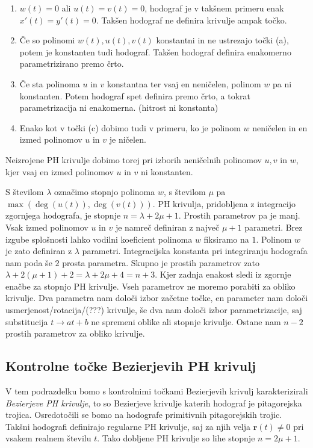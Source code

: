 \documentclass[isrm2, tisk]{fmfdelo}
\begin{document}
    \begin{enumerate}
        \itemsep0em
        \item $w(t)=0$ ali $u(t)=v(t)=0$, hodograf je v takšnem primeru enak $x'(t)=y'(t)=0$.
        Takšen hodograf ne definira krivulje ampak točko.
        \item  Če so polinomi $w(t),u(t),v(t)$ konstantni in ne ustrezajo točki (a), potem je konstanten tudi hodograf.
        Takšen hodograf definira enakomerno parametrizirano premo črto.
        \item  Če sta polinoma $u$ in $v$ konstantna ter vsaj en neničelen, polinom $w$ pa ni konstanten.
        Potem hodograf spet definira premo črto, a tokrat parametrizacija ni enakomerna. (hitrost ni konstanta)
        \item Enako kot v točki (c) dobimo tudi v primeru, ko je polinom $w$ neničelen in en izmed polinomov $u$ in $v$ je ničelen.
    \end{enumerate}
    \vspace{-0.3cm}
    \noindent Neizrojene PH krivulje dobimo torej pri izborih neničelnih polinomov $u,v$ in $w$, kjer vsaj en izmed polinomov $u$ in $v$ ni konstanten.

    S številom $\lambda$ označimo stopnjo polinoma $w$, s številom $\mu$ pa $\max(\deg(u(t)),\deg(v(t)))$.
    PH krivulja, pridobljena z integracijo zgornjega hodografa, je stopnje $n=\lambda + 2\mu + 1$.
    Prostih parametrov pa je manj.
    Vsak izmed polinomov $u$ in $v$ je namreč definiran z največ $\mu + 1$ parametri.
    Brez izgube splošnosti lahko vodilni koeficient polinoma $w$ fiksiramo na $1$.
    Polinom $w$ je zato definiran z $\lambda$ parametri.
    Integracijska konstanta pri integriranju hodografa nam poda še $2$ prosta parametra.
    Skupno je prostih parametrov zato $\lambda + 2(\mu+1)+2=\lambda + 2\mu+4 = n+3$.
    Kjer zadnja enakost sledi iz zgornje enačbe za stopnjo PH krivulje.
    Vseh parametrov ne moremo porabiti za obliko krivulje.
    Dva parametra nam določi izbor začetne točke, en parameter nam določi usmerjenost/rotacija/(???) krivulje, še dva nam določi izbor parametrizacije, saj substitucija $t\to at+b$ ne spremeni oblike ali stopnje krivulje.
    Ostane nam $n-2$ prostih parametrov za obliko krivulje.

    \subsection{Kontrolne točke Bezierjevih PH krivulj}
    V tem podrazdelku bomo s kontrolnimi točkami Bezierjevih krivulj karakterizirali \textit{Bezierjeve PH krivulje}, to so Bezierjeve krivulje katerih hodograf je pitagorejska trojica.
    Osredotočili se bomo na hodografe primitivnih pitagorejskih trojic.
    Takšni hodografi definirajo regularne PH krivulje, saj za njih velja $\mathbf{r}(t) \neq 0$ pri vsakem realnem številu $t$.
    Tako dobljene PH krivulje so lihe stopnje $n=2\mu+1$.
\end{document}
